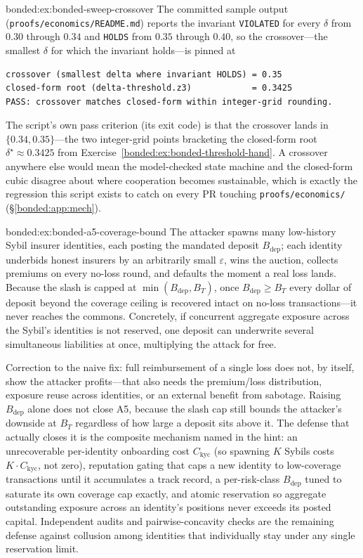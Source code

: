 \begin{pdSolution}{bonded:ex:bonded-sweep-crossover}
The committed sample output (\texttt{proofs/economics/README.md}) reports the invariant \texttt{VIOLATED} for every $\delta$ from $0.30$ through $0.34$ and \texttt{HOLDS} from $0.35$ through $0.40$, so the crossover---the smallest $\delta$ for which the invariant holds---is pinned at
\begin{lstlisting}
crossover (smallest delta where invariant HOLDS) = 0.35
closed-form root (delta-threshold.z3)            = 0.3425
PASS: crossover matches closed-form within integer-grid rounding.
\end{lstlisting}
The script's own pass criterion (its exit code) is that the crossover lands in $\{0.34, 0.35\}$---the two integer-grid points bracketing the closed-form root $\delta^\star\approx0.3425$ from Exercise~\ref{bonded:ex:bonded-threshold-hand}. A crossover anywhere else would mean the model-checked state machine and the closed-form cubic disagree about where cooperation becomes sustainable, which is exactly the regression this script exists to catch on every PR touching \texttt{proofs/economics/} (\S\ref{bonded:app:mech}).
\end{pdSolution}
\begin{pdSolution}{bonded:ex:bonded-a5-coverage-bound}
The attacker spawns many low-history Sybil insurer identities, each posting the mandated deposit $B_{\mathrm{dep}}$; each identity underbids honest insurers by an arbitrarily small $\varepsilon$, wins the auction, collects premiums on every no-loss round, and defaults the moment a real loss lands. Because the slash is capped at $\min(B_{\mathrm{dep}}, B_T)$, once $B_{\mathrm{dep}} \ge B_T$ every dollar of deposit beyond the coverage ceiling is recovered intact on no-loss transactions---it never reaches the commons. Concretely, if concurrent aggregate exposure across the Sybil's identities is not reserved, one deposit can underwrite several simultaneous liabilities at once, multiplying the attack for free.

Correction to the naive fix: full reimbursement of a single loss does not, by itself, show the attacker profits---that also needs the premium/loss distribution, exposure reuse across identities, or an external benefit from sabotage. Raising $B_{\mathrm{dep}}$ alone does not close A5, because the slash cap still bounds the attacker's downside at $B_T$ regardless of how large a deposit sits above it. The defense that actually closes it is the composite mechanism named in the hint: an unrecoverable per-identity onboarding cost $C_{\mathrm{kyc}}$ (so spawning $K$ Sybils costs $K \cdot C_{\mathrm{kyc}}$, not zero), reputation gating that caps a new identity to low-coverage transactions until it accumulates a track record, a per-risk-class $B_{\mathrm{dep}}$ tuned to saturate its own coverage cap exactly, and atomic reservation so aggregate outstanding exposure across an identity's positions never exceeds its posted capital. Independent audits and pairwise-concavity checks are the remaining defense against collusion among identities that individually stay under any single reservation limit.
\end{pdSolution}
